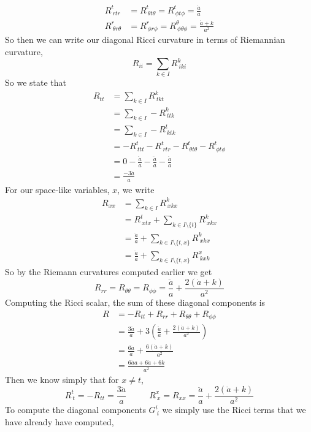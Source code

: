 \documentclass{article}
\theoremstyle{definition}
\begin{document}
\begin{align*}
    R^t_{\ rtr} &= R^t_{\ \theta t \theta} = R^t_{\ \phi t \phi} = \frac{\ddot a}{a}\\
    R^r_{\ \theta r \theta} &= R^r_{\ \phi r \phi} = R^\theta_{\ \phi \theta \phi} = \frac{\dot a + k}{a^2}
\end{align*}
So then we can write our diagonal Ricci curvature in terms of Riemannian curvature,
\[
    R_{ii} = \sum_{k \in I}R^k_{\ iki}
\]
So we state that
\begin{align*}
    R_{tt} &= \sum_{k \in I}R^k_{\ tkt}\\
    &= \sum_{k \in I}-R^k_{\ ttk} \\
    &= \sum_{k \in I}-R^t_{\ ktk} \\
    &= -R^t_{\ ttt} - R^t_{\ rtr} - R^t_{\ \theta t \theta} - R^t_{\ \phi t \phi} \\
    &= 0 - \frac{\ddot a}{a} -\frac{\ddot a}{a}-\frac{\ddot a}{a}\\
    &= \frac{-3\ddot a}{a}
\end{align*}
For our space-like variables, $x$, we write
\begin{align*}
    R_{xx} &= \sum_{k \in I} R^k_{\ x k x} \\
    &= R^t_{\ x t x} + \sum_{k \in I \setminus \{t\}}R^k_{\ x k x} \\
    &= \frac{\ddot a}{a} + \sum_{k \in I \setminus \{t, x\}}R^k_{\ x k x}\\
    &= \frac{\ddot a}{a} + \sum_{k \in I \setminus \{t, x\}}R^x_{\ k x k}
\end{align*}
So by the Riemann curvatures computed earlier we get
\[R_{rr} = R_{\theta\theta} = R_{\phi\phi} = \frac{\ddot a}{a} + \frac{2(\dot a + k)}{a^2}\]
Computing the Ricci scalar, the sum of these diagonal components is
\begin{align*}
    R &= -R_{tt} + R_{rr} + R_{\theta\theta} + R_{\phi \phi}\\
    &= \frac{3 \ddot a}{a} + 3 \left(\frac{\ddot a}{a} + \frac{2(\dot a + k)}{a^2}\right)\\
    &= \frac{6\ddot a}{a} + \frac{6(\dot a + k)}{a^2} \\
    &= \frac{6 \ddot a a + 6 \dot a + 6k}{a^2}
\end{align*}
Then we know simply that for $x \neq t$,
\[
    R^t_{\ t} = -R_{tt} = \frac{3\ddot a}{a} \ \ \ \ \ \ \ \ \ \ \ \ R^x_{\ x} = R_{xx} = \frac{\ddot a}{a} + \frac{2(\dot a + k)}{a^2}
\]
To compute the diagonal components $G^i_{\ i}$ we simply use the Ricci terms that we have already have computed,
\end{document}
